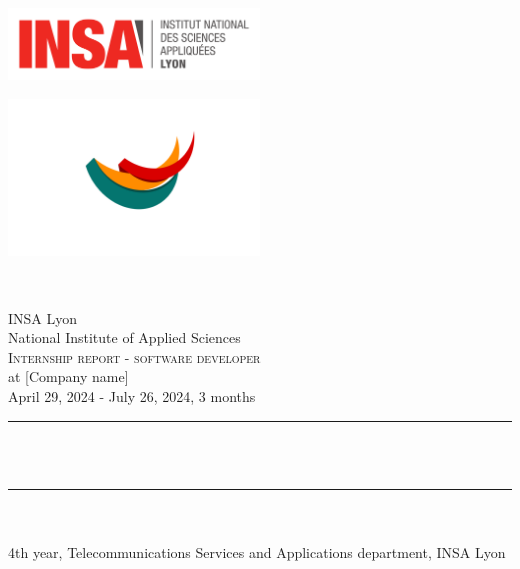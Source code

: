 \thispagestyle{empty} %
\begin{titlepage}
	\begin{minipage}{0.5\textwidth}

		\begin{flushleft} \includegraphics[width=0.5\textwidth]{images/INSA_logo.png}
		\end{flushleft}

	\end{minipage}
	\begin{minipage}{0.5\textwidth}

		\begin{flushright} \includegraphics[width=0.5\textwidth]{images/company_logo.png}
		\end{flushright}
        
	\end{minipage}\\[.5 cm]
	    
    \begin{center}

        {\Large INSA Lyon\\[.5 cm]National Institute of Applied Sciences}\\[1.5 cm]
        \textsc{\LARGE Internship report {-} software developer}\\[.5 cm]
        \large at [Company name]\\[.2 cm]April 29, 2024 {-} July 26, 2024, 3 months\\[1 cm]
	    \rule{\linewidth}{0.2 mm} \\[1 cm]{ \huge \bfseries \thetitle}\\[.7 cm]
	    \rule{\linewidth}{0.2 mm} \\[1 cm]{\LARGE \theauthor}\\[.2 cm]{\large 4th year, Telecommunications Services and Applications department, INSA Lyon }\\[1 cm]


\end{center}
\end{titlepage}

